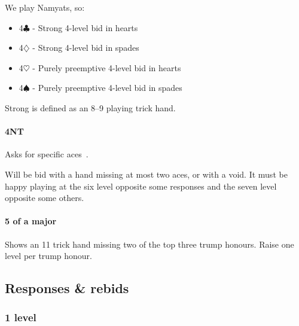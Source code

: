 \documentclass[a4paper,14pt]{extarticle}
\begin{document}
We play Namyats, so:

\begin{itemize}
\item 4$\clubsuit$ - Strong 4-level bid in hearts~
\item 4$\diamondsuit$ - Strong 4-level bid in spades~
\item 4$\heartsuit$ - Purely preemptive 4-level bid in hearts
\item 4$\spadesuit$ - Purely preemptive 4-level bid in spades
\end{itemize}

Strong is defined as an 8--9 playing trick hand.

\paragraph{4NT}

Asks for specific aces~.

Will be bid with a hand missing at most two aces, or with a void. It must be happy playing at the six level opposite some responses and the seven level opposite some others.

\paragraph{5 of a major}

Shows an 11 trick hand missing two of the top three trump honours. Raise one level per trump honour.

\subsection{Responses \& rebids}
\label{sec:responses}

\subsubsection{1 level}
\label{sec:resp:1level}
\end{document}
